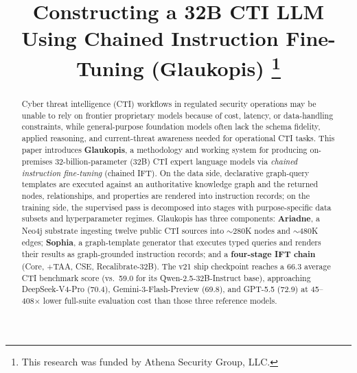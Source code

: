 \documentclass[conference]{IEEEtran}
\begin{document}
\title{Constructing a 32B CTI LLM Using Chained Instruction Fine-Tuning (Glaukopis)
\thanks{This research was funded by Athena Security Group, LLC.}
}

\author{%
%
}

\maketitle

\begin{abstract}
Cyber threat intelligence (CTI) workflows in regulated security operations may be unable to rely on frontier proprietary models because of cost, latency, or data-handling constraints, while general-purpose foundation models often lack the schema fidelity, applied reasoning, and current-threat awareness needed for operational CTI tasks. This paper introduces \textbf{Glaukopis}, a methodology and working system for producing on-premises 32-billion-parameter (32B) CTI expert language models via \textit{chained instruction fine-tuning} (chained IFT). On the data side, declarative graph-query templates are executed against an authoritative knowledge graph and the returned nodes, relationships, and properties are rendered into instruction records; on the training side, the supervised pass is decomposed into stages with purpose-specific data subsets and hyperparameter regimes. Glaukopis has three components: \textbf{Ariadne}, a Neo4j substrate ingesting twelve public CTI sources into ${\sim}280$K nodes and ${\sim}480$K edges; \textbf{Sophia}, a graph-template generator that executes typed queries and renders their results as graph-grounded instruction records; and a \textbf{four-stage IFT chain} (Core, +TAA, CSE, Recalibrate-32B). The v21 ship checkpoint reaches a 66.3 average CTI benchmark score (vs.\ 59.0 for its Qwen-2.5-32B-Instruct base), approaching DeepSeek-V4-Pro (70.4), Gemini-3-Flash-Preview (69.8), and GPT-5.5 (72.9) at 45--408$\times$ lower full-suite evaluation cost than those three reference models.
\end{abstract}
\end{document}
